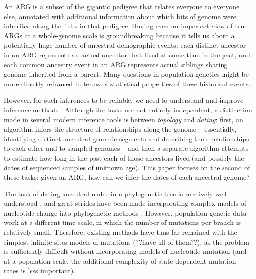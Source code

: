 \documentclass{article}
\begin{document}
An ARG is a subset of the gigantic pedigree that relates everyone to everyone else,
annotated with additional information about which bits of genome were inherited along the links in that pedigree.
Having even an imperfect view of true ARGs at a whole-genome scale is groundbreaking
because it tells us about a potentially huge number of ancestral demographic events:
each distinct ancestor in an ARG represents an actual ancestor that lived at some time in the past,
and each common ancestry event in an ARG represents actual siblings sharing genome inherited from a parent.
Many questions in population genetics 
might be more directly reframed in terms of statistical properties
of these historical events.

However, for such inferences to be reliable, we need to understand and improve inference methods \citep{XXX}.
Although the tasks are not entirely independent,
a distinction made in several modern inference tools is between \emph{topology} and \emph{dating}:
first, an algorithm infers the structure of relationships along the genome --
essentially, identifying distinct ancestral genomic segments and describing
their relationships to each other and to sampled genomes --
and then a separate algorithm attempts to estimate how long in the past each of those ancestors lived
(and possibly the dates of sequenced samples of unknown age).
This paper focuses on the second of these tasks: given an ARG,
how can we infer the dates of each ancestral genome?

The task of dating ancestral nodes in a phylogenetic tree is relatively well-understood \citep{felsenstein},
and great strides have been made incorporating complex models of nucleotide change
into phylogenetic methods \citep{beast}.
However, population genetic data work at a different time scale,
in which the number of mutations per branch is relatively small.
Therefore, existing methods have thus far remained with the simplest infinite-sites models of mutations
(??have all of them??),
as the problem is sufficiently difficult without incorporating models of nucleotide mutation
(and at a population scale, the additional complexity of state-dependent mutation rates is less important).
\end{document}
